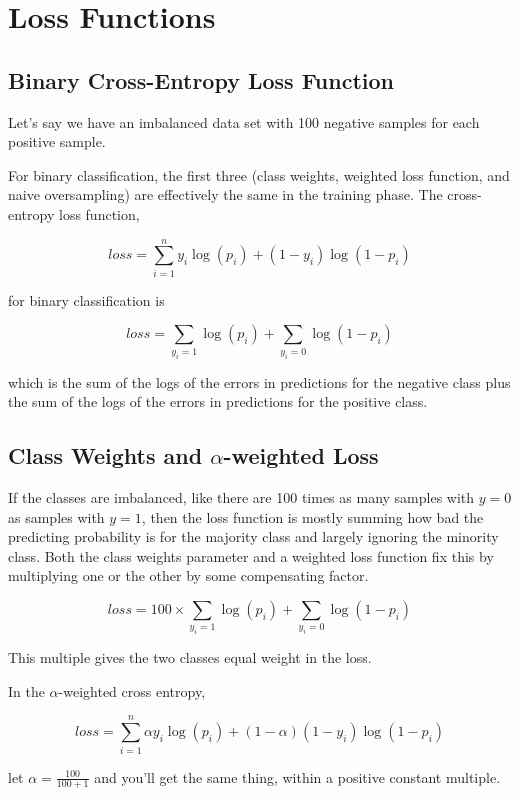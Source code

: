 \section{Loss Functions}

\subsection{Binary Cross-Entropy Loss Function}

Let's say we have an imbalanced data set with 100 negative samples for each positive sample.  

For binary classification, the first three (class weights, weighted loss function, and naive oversampling) are effectively the same in the training phase.  The cross-entropy loss function, 

$$loss = \sum_{i=1}^n y_i \log(p_i) + (1-y_i) \log (1-p_i)$$

for binary classification is

$$loss = \sum_{y_i=1} \log (p_i) + \sum_{y_i=0} \log (1-p_i)$$

which is the sum of the logs of the errors in predictions for the negative class plus the sum of the logs of the errors in predictions for the positive class.  

\subsection{Class Weights and $\alpha$-weighted Loss}

If the classes are imbalanced, like there are 100 times as many samples with $y=0$ as samples with $y=1$, then the loss function is mostly summing how bad the predicting probability is for the majority class and largely ignoring the minority class.  Both the class weights parameter and a weighted loss function fix this by multiplying one or the other by some compensating factor.

$$loss = 100 \times \sum_{y_i=1} \log (p_i) +  \sum_{y_i=0} \log (1-p_i)$$

This multiple gives the two classes equal weight in the loss.  

In the $\alpha$-weighted cross entropy, 

$$loss = \sum_{i=1}^n \alpha y_i \log(p_i) + (1 - \alpha) (1-y_i) \log (1 - p_i)$$

let $\alpha = \frac{100}{100+1}$ and you'll get the same thing, within a positive constant multiple.  

